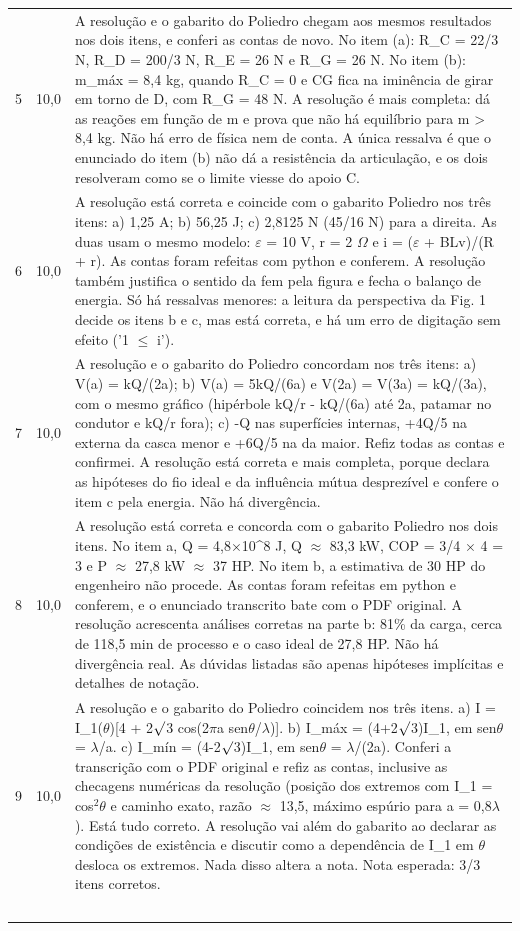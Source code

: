 \documentclass{article}%
\begin{document}
\begin{longtable}{@{}c c p{}@{}}
5 & 10,0 & A resolução e o gabarito do Poliedro chegam aos mesmos resultados nos dois itens, e conferi as contas de novo. No item (a): R\_C = 22/3 N, R\_D = 200/3 N, R\_E = 26 N e R\_G = 26 N. No item (b): m\_máx = 8,4 kg, quando R\_C = 0 e CG fica na iminência de girar em torno de D, com R\_G = 48 N. A resolução é mais completa: dá as reações em função de m e prova que não há equilíbrio para m > 8,4 kg. Não há erro de física nem de conta. A única ressalva é que o enunciado do item (b) não dá a resistência da articulação, e os dois resolveram como se o limite viesse do apoio C. \\
6 & 10,0 & A resolução está correta e coincide com o gabarito Poliedro nos três itens: a) 1,25 A; b) 56,25 J; c) 2,8125 N (45/16 N) para a direita. As duas usam o mesmo modelo: $\varepsilon$ = 10 V, r = 2 $\Omega$ e i = ($\varepsilon$ + BLv)/(R + r). As contas foram refeitas com python e conferem. A resolução também justifica o sentido da fem pela figura e fecha o balanço de energia. Só há ressalvas menores: a leitura da perspectiva da Fig. 1 decide os itens b e c, mas está correta, e há um erro de digitação sem efeito ('1 $\leq$ i'). \\
7 & 10,0 & A resolução e o gabarito do Poliedro concordam nos três itens: a) V(a) = kQ/(2a); b) V(a) = 5kQ/(6a) e V(2a) = V(3a) = kQ/(3a), com o mesmo gráfico (hipérbole kQ/r - kQ/(6a) até 2a, patamar no condutor e kQ/r fora); c) -Q nas superfícies internas, +4Q/5 na externa da casca menor e +6Q/5 na da maior. Refiz todas as contas e confirmei. A resolução está correta e mais completa, porque declara as hipóteses do fio ideal e da influência mútua desprezível e confere o item c pela energia. Não há divergência. \\
8 & 10,0 & A resolução está correta e concorda com o gabarito Poliedro nos dois itens. No item a, Q = 4,8$\times$10\^{}8 J, Q $\approx$ 83,3 kW, COP = 3/4 $\times$ 4 = 3 e P $\approx$ 27,8 kW $\approx$ 37 HP. No item b, a estimativa de 30 HP do engenheiro não procede. As contas foram refeitas em python e conferem, e o enunciado transcrito bate com o PDF original. A resolução acrescenta análises corretas na parte b: 81\% da carga, cerca de 118,5 min de processo e o caso ideal de 27,8 HP. Não há divergência real. As dúvidas listadas são apenas hipóteses implícitas e detalhes de notação. \\
9 & 10,0 & A resolução e o gabarito do Poliedro coincidem nos três itens. a) I = I\_1($\theta$){[}4 + 2$\surd$3 cos(2$\pi$a sen$\theta$/$\lambda$){]}. b) I\_máx = (4+2$\surd$3)I\_1, em sen$\theta$ = $\lambda$/a. c) I\_mín = (4-2$\surd$3)I\_1, em sen$\theta$ = $\lambda$/(2a). Conferi a transcrição com o PDF original e refiz as contas, inclusive as checagens numéricas da resolução (posição dos extremos com I\_1 = cos$^2$$\theta$ e caminho exato, razão $\approx$ 13,5, máximo espúrio para a = 0,8$\lambda$). Está tudo correto. A resolução vai além do gabarito ao declarar as condições de existência e discutir como a dependência de I\_1 em $\theta$ desloca os extremos. Nada disso altera a nota. Nota esperada: 3/3 itens corretos. \\
$$
\end{longtable}
\end{document}
